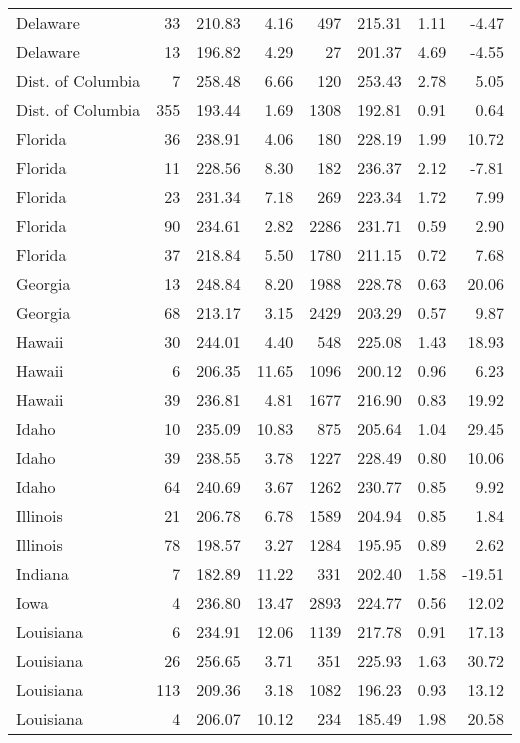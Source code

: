 \begin{longtable}{lrrr@{\extracolsep{10pt}}rrrr}
  Delaware &  33 & 210.83 & 4.16 & 497 & 215.31 & 1.11 & -4.47 \\ 
  Delaware &  13 & 196.82 & 4.29 &  27 & 201.37 & 4.69 & -4.55 \\ 
  Dist. of Columbia &   7 & 258.48 & 6.66 & 120 & 253.43 & 2.78 & 5.05 \\ 
  Dist. of Columbia & 355 & 193.44 & 1.69 & 1308 & 192.81 & 0.91 & 0.64 \\ 
  Florida &  36 & 238.91 & 4.06 & 180 & 228.19 & 1.99 & 10.72 \\ 
  Florida &  11 & 228.56 & 8.30 & 182 & 236.37 & 2.12 & -7.81 \\ 
  Florida &  23 & 231.34 & 7.18 & 269 & 223.34 & 1.72 & 7.99 \\ 
  Florida &  90 & 234.61 & 2.82 & 2286 & 231.71 & 0.59 & 2.90 \\ 
  Florida &  37 & 218.84 & 5.50 & 1780 & 211.15 & 0.72 & 7.68 \\ 
  Georgia &  13 & 248.84 & 8.20 & 1988 & 228.78 & 0.63 & 20.06 \\ 
  Georgia &  68 & 213.17 & 3.15 & 2429 & 203.29 & 0.57 & 9.87 \\ 
  Hawaii &  30 & 244.01 & 4.40 & 548 & 225.08 & 1.43 & 18.93 \\ 
  Hawaii &   6 & 206.35 & 11.65 & 1096 & 200.12 & 0.96 & 6.23 \\ 
  Hawaii &  39 & 236.81 & 4.81 & 1677 & 216.90 & 0.83 & 19.92 \\ 
  Idaho &  10 & 235.09 & 10.83 & 875 & 205.64 & 1.04 & 29.45 \\ 
  Idaho &  39 & 238.55 & 3.78 & 1227 & 228.49 & 0.80 & 10.06 \\ 
  Idaho &  64 & 240.69 & 3.67 & 1262 & 230.77 & 0.85 & 9.92 \\ 
  Illinois &  21 & 206.78 & 6.78 & 1589 & 204.94 & 0.85 & 1.84 \\ 
  Illinois &  78 & 198.57 & 3.27 & 1284 & 195.95 & 0.89 & 2.62 \\ 
  Indiana &   7 & 182.89 & 11.22 & 331 & 202.40 & 1.58 & -19.51 \\ 
  Iowa &   4 & 236.80 & 13.47 & 2893 & 224.77 & 0.56 & 12.02 \\ 
  Louisiana &   6 & 234.91 & 12.06 & 1139 & 217.78 & 0.91 & 17.13 \\ 
  Louisiana &  26 & 256.65 & 3.71 & 351 & 225.93 & 1.63 & 30.72 \\ 
  Louisiana & 113 & 209.36 & 3.18 & 1082 & 196.23 & 0.93 & 13.12 \\ 
  Louisiana &   4 & 206.07 & 10.12 & 234 & 185.49 & 1.98 & 20.58 \\ 

\end{longtable}
